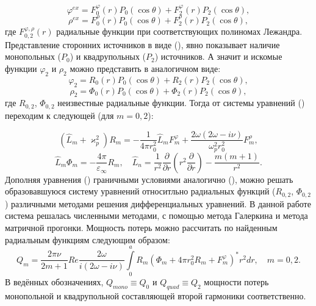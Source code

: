 \documentclass[12pt, a4paper]{article}
\def \eps {\varepsilon}
\def \w {\omega}
\def \ph {\varphi}
\def \kp { \varkappa}
\begin{document}
\begin{equation} 	
	\ph^{ex} = F_0^\ph(r)P_0(\cos\theta) + F_2^\ph(r)P_2(\cos\theta),
\end{equation}
\begin{equation} 	
	\rho^{ex} = F_0^\rho(r)P_0(\cos\theta) + F_2^\rho(r)P_2(\cos\theta),
\end{equation}
где $F_{0,2}^{\ph,\rho}(r)$ радиальные функции при соответствующих полиномах
Лежандра. Представление сторонних источников в виде (), явно
показывает наличие монопольных ($P_0$) и квадрупольных ($P_2$) источников. А
значит и искомые функции $\ph_2$ и $\rho_2$ можно представить в аналогичном виде:
\begin{equation} 	
	\ph_2 = R_0(r)P_0(\cos\theta) + R_2(r)P_2(\cos\theta),
\end{equation}
\begin{equation} 	
	\rho_2 = \Phi_0(r)P_0(\cos\theta) + \Phi_2(r)P_2(\cos\theta),
\end{equation}
где $R_{0,2}$, $\Phi_{0,2}$ неизвестные радиальные функции. Тогда от системы уравнений
() переходим к следующей (для $m=0,2$):

\begin{equation} 	
	(\hat L_m + \kp_p^2) R_m = -\frac{1}{4 \pi r_0^2}\hat L_m F_m^\ph  + \frac{2\w(2\w - i \nu)}{\w_p^2r_0^2}F_m^\rho,
\end{equation}
\begin{equation} 	
	\hat L_m \Phi_m = -\frac{4\pi}{\eps_\infty}R_m,  \quad \hat{L}_n = \frac{1}{r^2} \frac{\partial}{\partial r} \left( r^2 \frac{\partial}{\partial r} \right) - \frac{m(m+1)}{r^2}.
\end{equation}
Дополняя уравнения () граничными условиями аналогично (), можно решать образовавшуюся систему уравнений относитльно радиальных функций ($R_{0,2}$, $\Phi_{0,2}$) различными методами решения дифференциальных уравнений. В данной работе система решалась численными методами, с помощью метода Галеркина и метода матричной прогонки. Мощность потерь можно рассчитать по найденным радиальным функциям следующим образом:
\begin{equation} 	
Q_m = \frac{2\pi\nu}{2m+1}Re \frac{2\w}{i(2\w - i \nu)} \int\limits_0^a R_m(\Phi_m  + 4\pi r_0^2R_m + F_m^\ph)^*r^2dr, \quad m=0,2.	
\end{equation}
В ведённых обозначениях, $Q_{mono} \equiv Q_0$ и $Q_{quad} \equiv Q_2$ мощности
потерь монопольной и квадрупольной составляющей второй гармоники
соответственно. 
\end{document}
